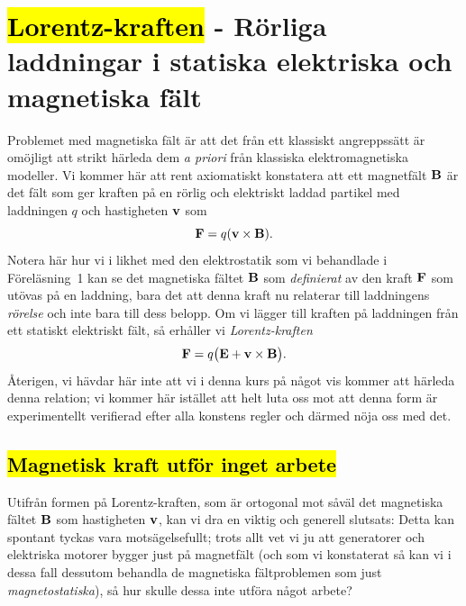 {{\section{{\hl{Lorentz-kraften}} - R{\"o}rliga laddningar i statiska elektriska
  och magnetiska f{\"a}lt}
\noindent
Problemet med magnetiska f{\"a}lt {\"a}r att det fr{\aa}n ett klassiskt
angreppss{\"a}tt {\"a}r om{\"o}jligt att strikt h{\"a}rleda dem {\it a priori}
fr{\aa}n klassiska elektromagnetiska modeller. Vi kommer h{\"a}r att rent
axiomatiskt konstatera att ett magnetf{\"a}lt ${\bf B}$ {\"a}r det f{\"a}lt
som ger kraften p{\aa} en r{\"o}rlig och elektriskt laddad partikel med
laddningen $q$ och hastigheten ${\bf v}$ som
$$
  {\bf F}=q({\bf v}\times{\bf B}).
$$
Notera h{\"a}r hur vi i likhet med den elektrostatik som vi behandlade
i F{\"o}rel{\"a}sning~1 kan se det magnetiska f{\"a}ltet ${\bf B}$ som
{\it definierat} av den kraft ${\bf F}$ som ut{\"o}vas p{\aa} en laddning,
bara det att denna kraft nu relaterar till laddningens {\it r{\"o}relse}
och inte bara till dess belopp.
Om vi l{\"a}gger till kraften p{\aa} laddningen fr{\aa}n ett statiskt elektriskt
f{\"a}lt, s{\aa} erh{\aa}ller vi {\it Lorentz-kraften}
\hl{$$
  {\bf F}=q\big({\bf E}+{\bf v}\times{\bf B}\big).
$$}
{\AA}terigen, vi h{\"a}vdar h{\"a}r inte att vi i denna kurs p{\aa} n{\aa}got
vis kommer att h{\"a}rleda denna relation; vi kommer h{\"a}r ist{\"a}llet att
helt luta oss mot att denna form {\"a}r experimentellt verifierad efter alla
konstens regler och d{\"a}rmed n{\"o}ja oss med det.

\subsection{{\hl{Magnetisk kraft utf{\"o}r inget arbete}}}
Utifr{\aa}n formen p{\aa} Lorentz-kraften, som {\"a}r ortogonal mot
s{\aa}v{\"a}l det magnetiska f{\"a}ltet ${\bf B}$ som hastigheten ${\bf v}$,
kan vi dra en viktig och generell slutsats:
\noindent
Detta kan spontant tyckas vara mots{\"a}gelsefullt; trots allt vet vi ju att
generatorer och elektriska motorer bygger just p{\aa} magnetf{\"a}lt (och som
vi konstaterat s{\aa} kan vi i dessa fall dessutom behandla de magnetiska
f{\"a}ltproblemen som just {\it magnetostatiska}), s{\aa} hur skulle dessa
inte utf{\"o}ra n{\aa}got arbete?

}}
